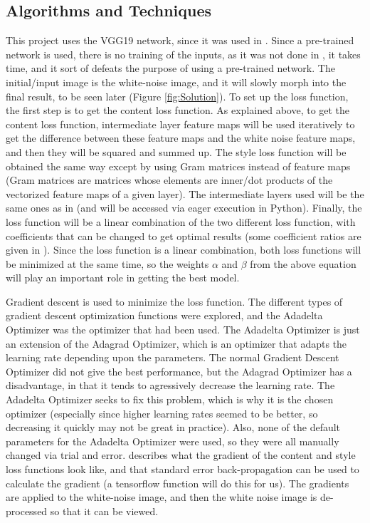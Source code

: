\documentclass[12pt]{article}
\begin{document}
\subsection{Algorithms and Techniques}
This project uses the VGG19 network, since it was used in \cite{Neural, Image}. Since a pre-trained network is used, there is no training of the inputs, as it was not done in \cite{Neural, Image}, it takes time, and it sort of defeats the purpose of using a pre-trained network. The initial/input image is the white-noise image, and it will slowly morph into the final result, to be seen later (Figure \ref{fig:Solution}). To set up the loss function, the first step is to get the content loss function. As explained above, to get the content loss function, intermediate layer feature maps will be used iteratively to get the difference between these feature maps and the white noise feature maps, and then they will be squared and summed up. The style loss function will be obtained the same way except by using Gram matrices instead of feature maps (Gram matrices are matrices whose elements are inner/dot products of the vectorized feature maps of a given layer). The intermediate layers used will be the same ones as in \cite{Neural} (and will be accessed via eager execution in Python). Finally, the loss function will be a linear combination of the two different loss function, with coefficients that can be changed to get optimal results (some coefficient ratios are given in \cite{Neural, Image}). Since the loss function is a linear combination, both loss functions will be minimized at the same time, so the weights $\alpha$ and $\beta$ from the above equation will play an important role in getting the best model.

Gradient descent is used to minimize the loss function. The different types of gradient descent optimization functions were explored, and the Adadelta Optimizer was the optimizer that had been used. The Adadelta Optimizer is just an extension of the Adagrad Optimizer, which is an optimizer that adapts the learning rate depending upon the parameters. The normal Gradient Descent Optimizer did not give the best performance, but the Adagrad Optimizer has a disadvantage, in that it tends to agressively decrease the learning rate. The Adadelta Optimizer seeks to fix this problem, which is why it is the chosen optimizer (especially since higher learning rates seemed to be better, so decreasing it quickly may not be great in practice). Also, none of the default parameters for the Adadelta Optimizer were used, so they were all manually changed via trial and error. \cite{Neural} describes what the gradient of the content and style loss functions look like, and that standard error back-propagation can be used to calculate the gradient (a tensorflow function will do this for us). The gradients are applied to the white-noise image, and then the white noise image is de-processed so that it can be viewed. 
\end{document}
